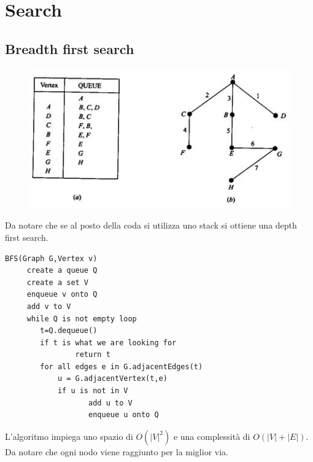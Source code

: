 \documentclass[a4paper]{book}
\newcommand{\lstIndent}{4}
\begin{document}
\section{Search}
\subsection{Breadth first search}
\begin{figure}[H]
\centering
\includegraphics[scale=1]{Figures/bfs.JPG}
\end{figure}
Da notare che se al posto della coda si utilizza uno stack si ottiene una depth first search.
\begin{lstlisting}[tabsize=\lstIndent]
BFS(Graph G,Vertex v)
     create a queue Q
     create a set V
     enqueue v onto Q
     add v to V
     while Q is not empty loop
     	t=Q.dequeue()
       	if t is what we are looking for 
            	return t
     	for all edges e in G.adjacentEdges(t)
			u = G.adjacentVertex(t,e)
           	if u is not in V
            	   add u to V
            	   enqueue u onto Q           
\end{lstlisting}
L'algoritmo impiega uno spazio di $O(|V|^2)$ e una complessità di $O(|V|+|E|)$. Da notare che ogni nodo viene raggiunto per la miglior via.
\end{document}
